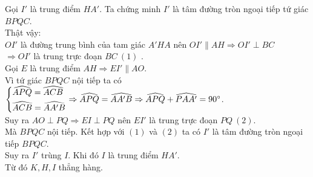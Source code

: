\begin{ex}
{\begin{enumerate}
         Gọi $I'$ là trung điểm $HA'$. Ta chứng minh $I'$ là tâm đường tròn ngoại tiếp tứ giác $BPQC$.\\
         Thật vậy:\\
         $OI'$ là đường trung bình của tam giác $A'HA$ nên $OI'\parallel AH\Rightarrow OI'\perp BC$\\ $\Rightarrow OI'$ là trung trực đoạn $BC\ (1)$ .\\
         Gọi $E$ là trung điểm $AH\Rightarrow EI'\parallel AO$.\\
         Vì tứ giác $BPQC$ nội tiếp ta có $\left\{\begin{aligned}&\widehat{APQ}=\widehat{ACB}\\&\widehat{ACB}=\widehat{AA'B}\end{aligned}\right.\Rightarrow \widehat{APQ}=\widehat{AA'B}\Rightarrow \widehat{APQ}+\widehat{PAA'}=90^\circ$.\\
         Suy ra $AO\perp PQ\Rightarrow EI\perp PQ$ nên $EI'$ là trung trực đoạn $PQ\ (2)$.\\
         Mà $BPQC$ nội tiếp. Kết hợp với $(1)$ và $(2)$ ta có $I'$ là tâm đường tròn ngoại tiếp $BPQC$.\\
         Suy ra $I'$ trùng $I$. Khi đó $I$ là trung điểm $HA'$.\\
         Từ đó $K,H,I$ thẳng hàng. 
    \end{enumerate}
    }
\end{ex}
